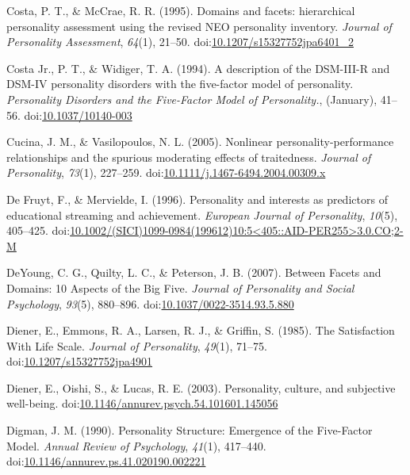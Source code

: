 \documentclass[,man,floatsintext]{apa6}
\theoremstyle{definition}
\theoremstyle{definition}
\theoremstyle{definition}
\theoremstyle{remark}
\begin{document}
\leavevmode\hypertarget{ref-Costa1995}{}%
Costa, P. T., \& McCrae, R. R. (1995). Domains and facets: hierarchical
personality assessment using the revised NEO personality inventory.
\emph{Journal of Personality Assessment}, \emph{64}(1), 21--50.
doi:\href{https://doi.org/10.1207/s15327752jpa6401_2}{10.1207/s15327752jpa6401\_2}

\leavevmode\hypertarget{ref-Widiger1994}{}%
Costa Jr., P. T., \& Widiger, T. A. (1994). A description of the
DSM-III-R and DSM-IV personality disorders with the five-factor model of
personality. \emph{Personality Disorders and the Five-Factor Model of
Personality.}, (January), 41--56.
doi:\href{https://doi.org/10.1037/10140-003}{10.1037/10140-003}

\leavevmode\hypertarget{ref-Cucina2005}{}%
Cucina, J. M., \& Vasilopoulos, N. L. (2005). Nonlinear
personality-performance relationships and the spurious moderating
effects of traitedness. \emph{Journal of Personality}, \emph{73}(1),
227--259.
doi:\href{https://doi.org/10.1111/j.1467-6494.2004.00309.x}{10.1111/j.1467-6494.2004.00309.x}

\leavevmode\hypertarget{ref-DeFruyt1996}{}%
De Fruyt, F., \& Mervielde, I. (1996). Personality and interests as
predictors of educational streaming and achievement. \emph{European
Journal of Personality}, \emph{10}(5), 405--425.
doi:\href{https://doi.org/10.1002/(SICI)1099-0984(199612)10:5\%3C405::AID-PER255\%3E3.0.CO;2-M}{10.1002/(SICI)1099-0984(199612)10:5\textless{}405::AID-PER255\textgreater{}3.0.CO;2-M}

\leavevmode\hypertarget{ref-DeYoung2007}{}%
DeYoung, C. G., Quilty, L. C., \& Peterson, J. B. (2007). Between Facets
and Domains: 10 Aspects of the Big Five. \emph{Journal of Personality
and Social Psychology}, \emph{93}(5), 880--896.
doi:\href{https://doi.org/10.1037/0022-3514.93.5.880}{10.1037/0022-3514.93.5.880}

\leavevmode\hypertarget{ref-Diener1985}{}%
Diener, E., Emmons, R. A., Larsen, R. J., \& Griffin, S. (1985). The
Satisfaction With Life Scale. \emph{Journal of Personality},
\emph{49}(1), 71--75.
doi:\href{https://doi.org/10.1207/s15327752jpa4901}{10.1207/s15327752jpa4901}

\leavevmode\hypertarget{ref-Diener2003}{}%
Diener, E., Oishi, S., \& Lucas, R. E. (2003). Personality, culture, and
subjective well-being.
doi:\href{https://doi.org/10.1146/annurev.psych.54.101601.145056}{10.1146/annurev.psych.54.101601.145056}

\leavevmode\hypertarget{ref-Digman1990}{}%
Digman, J. M. (1990). Personality Structure: Emergence of the
Five-Factor Model. \emph{Annual Review of Psychology}, \emph{41}(1),
417--440.
doi:\href{https://doi.org/10.1146/annurev.ps.41.020190.002221}{10.1146/annurev.ps.41.020190.002221}
\end{document}
